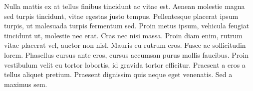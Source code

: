 Nulla mattis ex at tellus finibus tincidunt ac vitae est. Aenean molestie magna sed turpis tincidunt, vitae egestas justo tempus. Pellentesque placerat ipsum turpis, ut malesuada turpis fermentum sed. Proin metus ipsum, vehicula feugiat tincidunt ut, molestie nec erat. Cras nec nisi massa. Proin diam enim, rutrum vitae placerat vel, auctor non nisl. Mauris eu rutrum eros. Fusce ac sollicitudin lorem. Phasellus cursus ante eros, cursus accumsan purus mollis faucibus. Proin vestibulum velit eu tortor lobortis, id gravida tortor efficitur. Praesent a eros a tellus aliquet pretium. Praesent dignissim quis neque eget venenatis. Sed a maximus sem.
